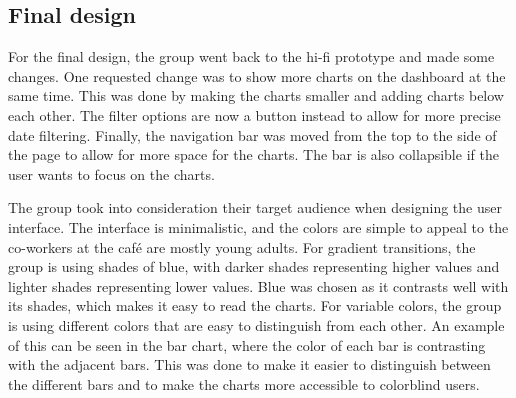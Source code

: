 \subsection{Final design}\label{subsec:final-design}

For the final design, the group went back to the hi-fi prototype and made some changes.
One requested change was to show more charts on the dashboard at the same time.
This was done by making the charts smaller and adding charts below each other.
The filter options are now a button instead to allow for more precise date filtering.
Finally, the navigation bar was moved from the top to the side of the page to allow for more space for the charts.
The bar is also collapsible if the user wants to focus on the charts.

The group took into consideration their target audience when designing the user interface.
The interface is minimalistic, and the colors are simple to appeal to the co-workers at the café are mostly young
adults.
For gradient transitions, the group is using shades of blue, with darker shades representing higher values and lighter
shades representing lower values.
Blue was chosen as it contrasts well with its shades, which makes it easy to read the charts.
For variable colors, the group is using different colors that are easy to distinguish from each other.
An example of this can be seen in the bar chart, where the color of each bar is contrasting with the adjacent bars.
This was done to make it easier to distinguish between the different bars and to make the charts more accessible to
colorblind users.

